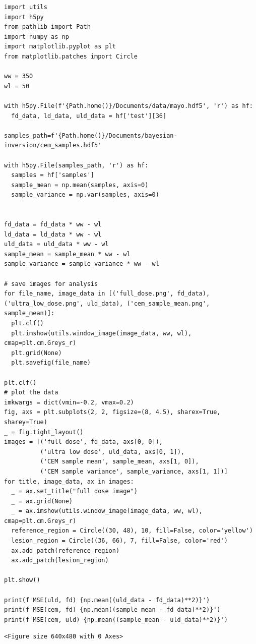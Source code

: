 \documentclass[a4paper, 11pt]{article}
\begin{document}
\begin{verbatim}
import utils
import h5py
from pathlib import Path
import numpy as np
import matplotlib.pyplot as plt
from matplotlib.patches import Circle

ww = 350
wl = 50

with h5py.File(f'{Path.home()}/Documents/data/mayo.hdf5', 'r') as hf:
  fd_data, ld_data, uld_data = hf['test'][36]

samples_path=f'{Path.home()}/Documents/bayesian-inversion/cem_samples.hdf5'

with h5py.File(samples_path, 'r') as hf:
  samples = hf['samples']
  sample_mean = np.mean(samples, axis=0)
  sample_variance = np.var(samples, axis=0)


fd_data = fd_data * ww - wl
ld_data = ld_data * ww - wl
uld_data = uld_data * ww - wl
sample_mean = sample_mean * ww - wl
sample_variance = sample_variance * ww - wl

# save images for analysis
for file_name, image_data in [('full_dose.png', fd_data), ('ultra_low_dose.png', uld_data), ('cem_sample_mean.png', sample_mean)]:
  plt.clf()
  plt.imshow(utils.window_image(image_data, ww, wl), cmap=plt.cm.Greys_r)
  plt.grid(None)
  plt.savefig(file_name)

plt.clf()
# plot the data
imkwargs = dict(vmin=-0.2, vmax=0.2)
fig, axs = plt.subplots(2, 2, figsize=(8, 4.5), sharex=True, sharey=True)
_ = fig.tight_layout()
images = [('full dose', fd_data, axs[0, 0]),
          ('ultra low dose', uld_data, axs[0, 1]),
          ('CEM sample mean', sample_mean, axs[1, 0]),
          ('CEM sample variance', sample_variance, axs[1, 1])]
for title, image_data, ax in images:
  _ = ax.set_title("full dose image")
  _ = ax.grid(None)
  _ = ax.imshow(utils.window_image(image_data, ww, wl), cmap=plt.cm.Greys_r)
  reference_region = Circle((30, 48), 10, fill=False, color='yellow')
  lesion_region = Circle((36, 66), 7, fill=False, color='red')
  ax.add_patch(reference_region)
  ax.add_patch(lesion_region)

plt.show()

print(f'MSE(uld, fd) {np.mean((uld_data - fd_data)**2)}')
print(f'MSE(cem, fd) {np.mean((sample_mean - fd_data)**2)}')
print(f'MSE(cem, uld) {np.mean((sample_mean - uld_data)**2)}')
\end{verbatim}

\begin{verbatim}
<Figure size 640x480 with 0 Axes>
\end{verbatim}
\end{document}
